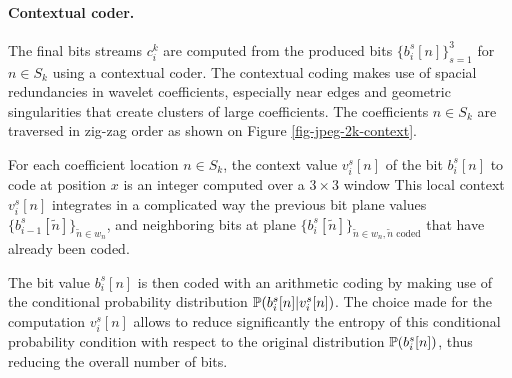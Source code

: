 \paragraph{Contextual coder.}

The final bits streams $c_i^k$ are computed from the produced bits $\{ b_i^s[n] \}_{s=1}^3$ for $n \in S_k$ using a contextual coder.
The contextual coding makes use of spacial redundancies in wavelet coefficients, especially near edges and geometric singularities that create clusters of large coefficients. The coefficients $n \in S_k$ are traversed in zig-zag order as shown on Figure \ref{fig-jpeg-2k-context}. 



For each coefficient location $n \in S_k$, the context value $v_i^s[n]$ of the bit $b_i^s[n]$ to code at position $x$ is an integer computed over a $3 \times 3$ window 
This local context $v_i^s[n]$ integrates in a complicated way the previous bit plane values $\{ b_{i-1}^s[\tilde n] \}_{\tilde n \in w_n}$, and neighboring bits at plane $\{ b_i^s[\tilde n] \}_{\tilde n \in w_n, \tilde n \text{ coded}}$ that have already been coded.

The bit value $b_i^s[n]$ is then coded with an arithmetic coding by making use of the conditional probability distribution $\mathbb{P}( b_i^s[n] | v_i^s[n] )$. The choice made for the computation $v_i^s[n]$ allows to reduce significantly the entropy of this conditional probability condition with respect to the original distribution $\mathbb{P}( b_i^s[n] )$, thus reducing the overall number of bits.
